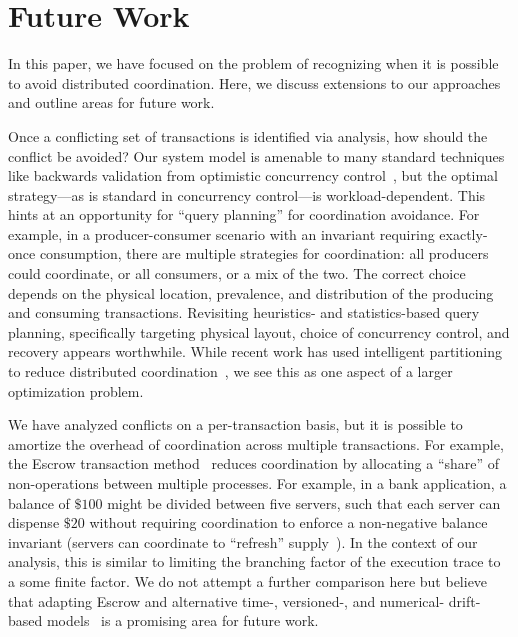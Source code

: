 
\section{Future Work}
\label{sec:discussion}

In this paper, we have focused on the problem of recognizing when it
is possible to avoid distributed coordination. Here, we discuss
extensions to our approaches and outline areas for future work.

 Once a conflicting set of transactions
is identified via \iconfluence analysis, how should the conflict be
avoided? Our system model is amenable to many standard techniques like
backwards validation from optimistic concurrency
control~\cite{bernstein-book,tamer-book}, but the optimal
strategy---as is standard in concurrency control---is
workload-dependent. This hints at an opportunity for ``query
planning'' for coordination avoidance. For example, in a
producer-consumer scenario with an invariant requiring exactly-once
consumption, there are multiple strategies for coordination: all
producers could coordinate, or all consumers, or a mix of the two. The
correct choice depends on the physical location, prevalence, and
distribution of the producing and consuming transactions. Revisiting
heuristics- and statistics-based query planning, specifically
targeting physical layout, choice of concurrency control, and recovery
appears worthwhile. While recent work has used intelligent
partitioning to reduce distributed coordination~\cite{schism}, we see
this as one aspect of a larger optimization problem.

 We have analyzed conflicts on a
per-transaction basis, but it is possible to amortize the overhead of
coordination across multiple transactions. For example, the Escrow
transaction method~\cite{escrow} reduces coordination by allocating a
``share'' of non-\iconfluent operations between multiple
processes. For example, in a bank application, a balance of $\$100$
might be divided between five servers, such that each server can
dispense $\$20$ without requiring coordination to enforce a
non-negative balance invariant (servers can coordinate to ``refresh''
supply~\cite{mdcc}). In the context of our \cfreedom analysis, this is
similar to limiting the branching factor of the execution trace to a
some finite factor. We do not attempt a further comparison here but
believe that adapting Escrow and alternative time-, versioned-, and
numerical- drift-based models~\cite{epsilon-divergence} is a promising
area for future work.

